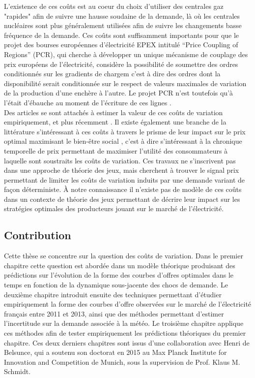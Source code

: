 L'existence de ces coûts est au coeur du choix d'utiliser des centrales gaz "rapides" afin de suivre une hausse soudaine de la demande, là où les centrales nucléaires sont plus généralement utilisées afin de suivre les changements basse fréquence de la demande. Ces coûts sont suffisamment importants pour que le projet des bourses européennes d'électricité EPEX intitulé ``Price Coupling of Regions'' (PCR), qui cherche à développer un unique mécanisme de couplage des prix européens de l'électricité, considère la possibilité de soumettre des ordres conditionnés sur les gradients de chargem c'est à dire des ordres dont la disponibilité serait conditionnée sur le respect de valeurs maximales de variation de la production d'une enchère à l'autre. Le projet PCR n'est toutefois qu'à l'était d'ébauche au moment de l'écriture de ces lignes \cite{EPEXPCR}.\\

Des articles se sont attachés à estimer la valeur de ces coûts de variation empiriquement, \cite{wolak2007quantifying} et plus récemment \cite{reguant2011welfare}. Il existe également une branche de la littérature s'intéressant à ces coûts à travers le prisme de leur impact sur le prix optimal maximisant le bien-être social \cite{tanaka2006real}, c'est à dire s'intéressant à la chronique temporelle de prix permettant de maximiser l'utilité des consommateurs à laquelle sont soustraits les coûts de variation. Ces travaux ne s'inscrivent pas dans une approche de théorie des jeux, mais cherchent à trouver le signal prix permettant de limiter les coûts de variation induits par une demande variant de façon déterministe. \`A notre connaissance il n'existe pas de modèle de ces coûts dans un contexte de théorie des jeux permettant de décrire leur impact sur les stratégies optimales des producteurs jouant sur le marché de l'électricité.

\subsection*{Contribution}
Cette thèse se concentre sur la question des coûts de variation. Dans le premier chapitre cette question est abordée dans un modèle théorique produisant des prédictions sur l'évolution de la forme des courbes d'offres optimales dans le temps en fonction de la dynamique sous-jacente des chocs de demande. Le deuxième chapitre introduit ensuite des techniques permettant d'étudier empiriquement la forme des courbes d'offre observées sur le marché de l'électricité français entre 2011 et 2013, ainsi que des méthodes permettant d'estimer l'incertitude sur la demande associée à la météo. Le troisième chapitre applique ces méthodes afin de tester empiriquement les prédictions théoriques du premier chapitre. Ces deux derniers chapitres sont issus d'une collaboration avec Henri de Belsunce, qui a soutenu son doctorat en 2015 au Max Planck Institute for Innovation and Competition de Munich, sous la supervision de Prof. Klaus M. Schmidt.\\


